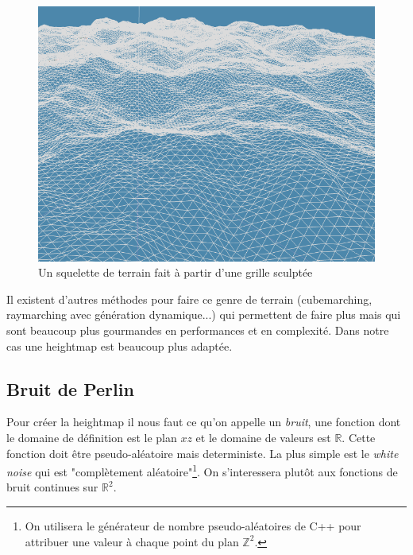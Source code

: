 \documentclass[11pt]{article} %
\begin{document}
\begin{figure}[h]
	\centering
	\includegraphics[scale=.49]{terrain_wireframe}
	\caption{Un squelette de terrain fait à partir d'une grille sculptée} %
	\label{fig:wireframe_terrain}
\end{figure}

Il existent d'autres méthodes pour faire ce genre de terrain (cubemarching, raymarching avec génération dynamique...) qui permettent de faire plus mais qui sont beaucoup plus gourmandes en performances et en complexité. Dans notre cas une heightmap est beaucoup plus adaptée.

\subsection{Bruit de Perlin}

Pour créer la heightmap il nous faut ce qu'on appelle un \textit{bruit}, une fonction dont le domaine de définition est le plan $xz$ et le domaine de valeurs est $\mathbb{R}$. Cette fonction doit être pseudo-aléatoire mais deterministe. La plus simple est le \textit{white noise} qui est "complètement aléatoire"\footnote{On utilisera le générateur de nombre pseudo-aléatoires de C++ pour attribuer une valeur à chaque point du plan $\mathbb{Z}^2$.}. On s'interessera plutôt aux fonctions de bruit continues sur $\mathbb{R}^2$.
\end{document}
